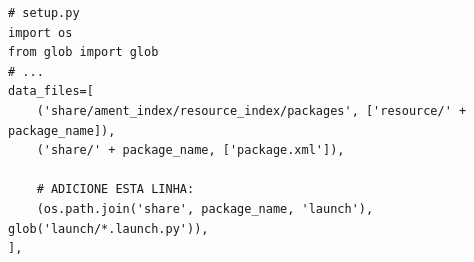 \documentclass[preview,border=2pt]{standalone}
\begin{document}
\begin{lstlisting}[style=pythonstyle]
# setup.py
import os
from glob import glob
# ...
data_files=[
    ('share/ament_index/resource_index/packages', ['resource/' + package_name]),
    ('share/' + package_name, ['package.xml']),
    
    # ADICIONE ESTA LINHA:
    (os.path.join('share', package_name, 'launch'), glob('launch/*.launch.py')),
],
\end{lstlisting}
\end{document}
